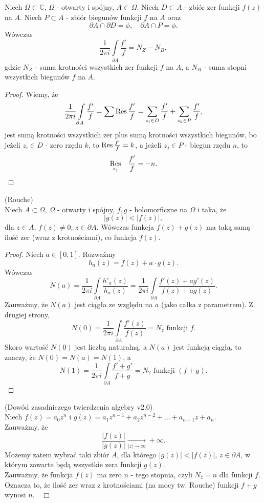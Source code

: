 \documentclass[../main.tex]{subfiles}
\begin{document}
\begin{tw}
    Niech $\Omega\subset\mathbb{C}$, $\Omega$ - otwarty i spójny, $A\subset\Omega$. Niech $D\subset A$ - zbiór zer funkcji $f(z)$ na $A$. Niech $P\subset A$ - zbiór biegunów funkcji $f$ na $A$ oraz
    \[
    \partial A \cap \partial D = \phi,\quad \partial A \cap P = \phi
    .\]
Wówczas
\[
    \frac{1}{2\pi i }\int\limits_{\partial A} \frac{f'}{f} = N_Z - N_B
,\]
gdzie $N_Z$ - suma krotności wszystkich zer funkcji $f$ na $A$, a $N_B$ - suma stopni wszystkich biegunów $f$ na $A$.
\end{tw}
\begin{proof}
    Wiemy, że
    \[
        \frac{1}{2\pi i}\int\limits_{\partial A}\frac{f'}{f} = \sum \operatorname{Res} \frac{f'}{f} = \sum_{z_i \in D} \frac{f'}{f} + \sum_{z_k\in P} \frac{f'}{f}
    ,\]
jest sumą krotności wszystkich zer plus sumą krotności wszystkich biegunów, bo jeżeli $z_i\in D$ - zero rzędu $k$, to $\operatorname{Res} \frac{f'}{f} = k$, a jeżeli $z_j\in P$ - biegun rzędu $n$, to
    \[
        \underset{z_j}{\operatorname{Res}}\quad \frac{f'}{f} = -n
    .\]
\end{proof}
\begin{tw}
    (Rouche)\\
    Niech $A\subset\Omega$, $\Omega$ - otwarty i spójny, $f,g$ - holomorficzne na $\Omega$ i taka, że
    \[
        \left| g(z) \right| < \left| f(z) \right|
    ,\]
dla $z\in A$, $f(z) \neq 0$, $z\in \partial A$.
    Wówczas funkcja $f(z) + g(z)$ ma taką samą ilość zer (wraz z krotnościami), co funkcja $f(z)$.
\end{tw}
\begin{proof}
    Niech $a\in \left[ 0,1 \right] $. Rozważmy
    \[
        h_a(z) = f(z) + a\cdot g(z)
    .\]
Wówczas
\[
    N(a) = \frac{1}{2\pi i} \int\limits_{\partial A}\frac{h'_a(z)}{h_a(z)} = \frac{1}{2\pi i}\int\limits_{\partial A} \frac{f'(z) + a g'(z)}{f(z) + ag(z)}
.\]
Zauważmy, że $N(a)$ jest ciągła ze względu na $a$ (jako całka z parametrem). Z drugiej strony,
\[
    N(0) = \frac{1}{2\pi i}\int\limits_{\partial A} \frac{f'(z)}{f(z)} = N_z \text{ funkcji } f
.\]
Skoro wartość $N(0)$ jest liczbą naturalną, a $N(a)$ jest funkcją ciągłą, to znaczy, że $N(0) = N(a) = N(1)$, a
\[
    N(1) = \frac{1}{2\pi i}\int\limits_{\partial A}\frac{f' + g'}{f+g} = N_2 \text{ funkcji }(f+g)
.\]
\end{proof}
\begin{przyklad}
    (Dowód zasadniczego twierdzenia algebry v2.0)\\
    Niech $f(z) = a_0z^n$ i $g(z) = a_1z^{n-1} + a_2z^{n-2} + \ldots + a_{n-1}z + a_n$.\\
    Zauważmy, że
    \[
        \frac{\left| f(z) \right| }{\left| g(z) \right| } \underset{|z|\to \infty}{\longrightarrow} +\infty
    .\]
Możemy zatem wybrać taki zbiór $A$, dla którego $|g(z)| < |f(z)|$, $z\in \partial A$, w którym zawarte będą wszystkie zera funkcji $g(z)$.\\
    Zauważmy, że funkcja $f(z)$ ma zero $n$ - tego stopnia, czyli $N_z = n$ dla funkcji $f$. Oznacza to, że ilość zer wraz z krotnościami (na mocy tw. Rouche) funkcji $f+g$ wynosi $n.\quad \Box$
\end{przyklad}
\end{document}
